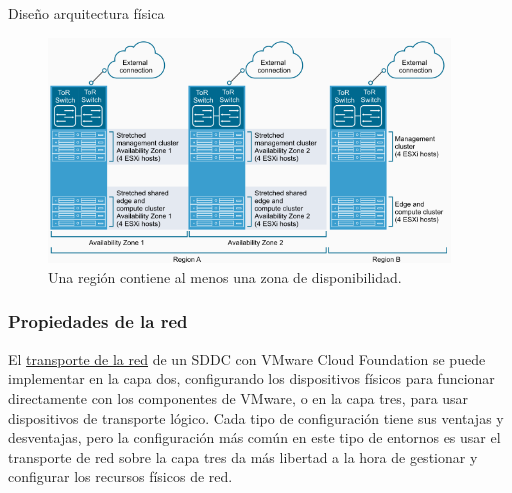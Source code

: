 \begin{subsection}{Diseño arquitectura física}
\begin{figure}[h!]
  \centering
  \includegraphics[width=0.95\textwidth]{imaxes/conceptosPrevios/zonasDispRegiones.png}
  \caption{Una región contiene al menos una zona de disponibilidad.}
  \label{fig:AVRegiones}
\end{figure}
\FloatBarrier

\subsubsection{Propiedades de la red}
El \underline{transporte de la red} de un SDDC con VMware Cloud Foundation se puede implementar en la capa dos, configurando los dispositivos físicos para funcionar directamente con los componentes de VMware, o en la capa tres, para usar dispositivos de transporte lógico. Cada tipo de configuración tiene sus ventajas y desventajas, pero la configuración más común en este tipo de entornos es usar el transporte de red sobre la capa tres da más libertad a la hora de gestionar y configurar los recursos físicos de red.\\



\end{subsection}

